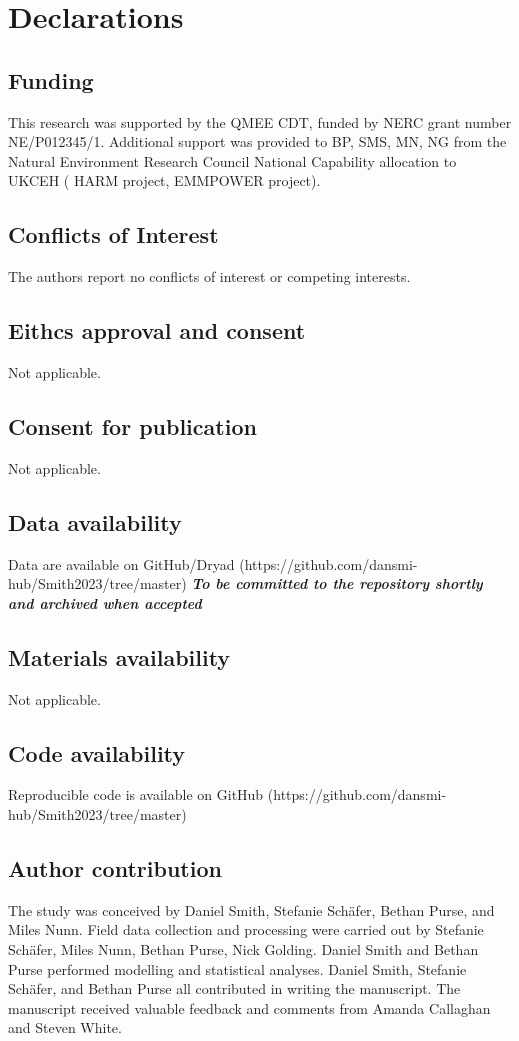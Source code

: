\documentclass[lineno,sn-basic]{sn-jnl}%
\begin{document}
\section*{Declarations}

\subsection{Funding}
This research was supported by the QMEE CDT, funded by NERC grant number NE/P012345/1. Additional support was provided to BP, SMS, MN, NG from the Natural Environment Research Council National Capability allocation to UKCEH ( HARM project, EMMPOWER project).
\subsection{Conflicts of Interest}
The authors report no conflicts of interest or competing interests.
\subsection{Eithcs approval and consent}
Not applicable.
\subsection{Consent for publication}
Not applicable.
\subsection{Data availability}
Data are available on GitHub/Dryad (https://github.com/dansmi-hub/Smith2023/tree/master) \textbf{\textit{To be committed to the repository shortly and archived when accepted}}
\subsection{Materials availability}
Not applicable.
\subsection{Code availability}
Reproducible code is available on GitHub (https://github.com/dansmi-hub/Smith2023/tree/master)
\subsection{Author contribution}
The study was conceived by Daniel Smith, Stefanie Schäfer, Bethan Purse, and Miles Nunn. Field data collection and processing were carried out by Stefanie Schäfer, Miles Nunn, Bethan Purse, Nick Golding. Daniel Smith and Bethan Purse performed modelling and statistical analyses. Daniel Smith, Stefanie Schäfer, and Bethan Purse all contributed in writing the manuscript. The manuscript received valuable feedback and comments from Amanda Callaghan and Steven White.
\end{document}

